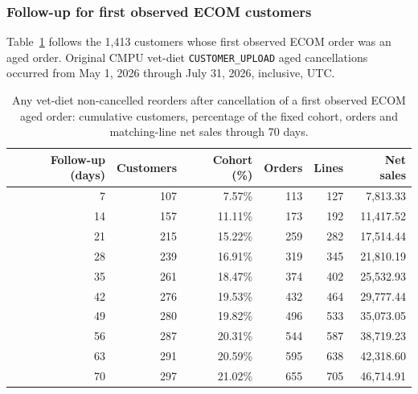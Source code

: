 \clearpage
\subsubsection{Follow-up for first observed ECOM customers}
Table~\ref{tab:financial-opportunity-new-chewy-any-vet-diet} follows the
1,413 customers whose first observed ECOM order was an aged order. Original CMPU vet-diet
\texttt{CUSTOMER\_UPLOAD} aged cancellations occurred from
May 1, 2026 through July 31, 2026, inclusive, UTC.

\begin{table}[!htbp]
\centering
\caption{Any vet-diet non-cancelled reorders after cancellation of a first observed ECOM aged order: cumulative customers, percentage of the fixed cohort, orders and matching-line net sales through 70 days.}
\label{tab:financial-opportunity-new-chewy-any-vet-diet}
\begin{tabular}{@{}rrrrrr@{}}
\toprule
Follow-up (days) & Customers & Cohort (\%) & Orders & Lines & Net sales \\
\midrule
7 & 107 & 7.57\% & 113 & 127 & 7,813.33 \\
14 & 157 & 11.11\% & 173 & 192 & 11,417.52 \\
21 & 215 & 15.22\% & 259 & 282 & 17,514.44 \\
28 & 239 & 16.91\% & 319 & 345 & 21,810.19 \\
35 & 261 & 18.47\% & 374 & 402 & 25,532.93 \\
42 & 276 & 19.53\% & 432 & 464 & 29,777.44 \\
49 & 280 & 19.82\% & 496 & 533 & 35,073.05 \\
56 & 287 & 20.31\% & 544 & 587 & 38,719.23 \\
63 & 291 & 20.59\% & 595 & 638 & 42,318.60 \\
70 & 297 & 21.02\% & 655 & 705 & 46,714.91 \\
\bottomrule
\end{tabular}


\end{table}
